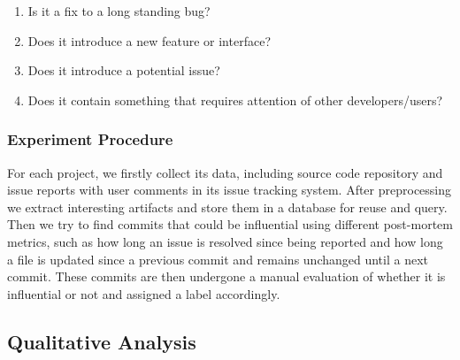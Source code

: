 \begin{enumerate}
    \item Is it a fix to a long standing bug?
    \item Does it introduce a new feature or interface?
    \item Does it introduce a potential issue?
    \item Does it contain something that requires attention of other developers/users?
\end{enumerate}

\subsubsection{Experiment Procedure}
\label{sec:procedure}
For each project, we firstly collect its data, including source code repository
and issue reports with user comments in its issue tracking system. After
preprocessing we extract interesting artifacts and store them in a database
for reuse and query.  Then we try to find commits that could be influential
using different post-mortem metrics, such as how long an issue is resolved
since being reported and how long a file is updated since a previous commit and
remains unchanged until a next commit.  These commits are then undergone a
manual evaluation of whether it is influential or not and assigned a label
accordingly.




\subsection{Qualitative Analysis}

